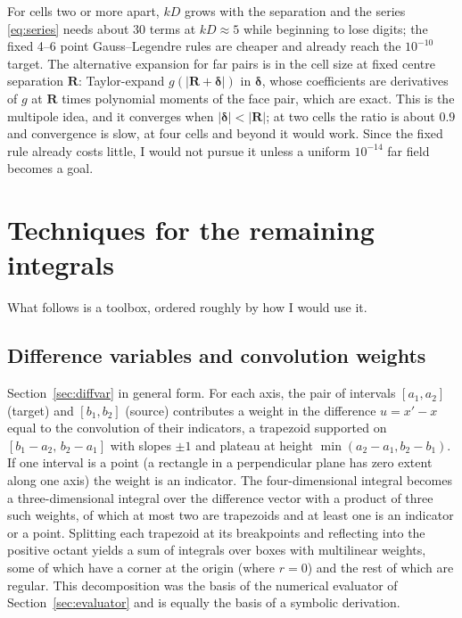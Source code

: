 \documentclass[11pt]{article}
\theoremstyle{remark}
\begin{document}
For cells two or more apart, $kD$ grows with the separation and the series
\eqref{eq:series} needs about 30 terms at $kD\approx 5$ while beginning to lose
digits; the fixed 4--6 point Gauss--Legendre rules are cheaper and already reach the
$10^{-10}$ target. The alternative expansion for far pairs is in the cell size at
fixed centre separation $\mathbf{R}$: Taylor-expand $g(|\mathbf{R} + \boldsymbol{\delta}|)$
in $\boldsymbol{\delta}$, whose coefficients are derivatives of $g$ at $\mathbf{R}$
times polynomial moments of the face pair, which are exact. This is the multipole
idea, and it converges when $|\boldsymbol{\delta}| < |\mathbf{R}|$; at two cells the
ratio is about $0.9$ and convergence is slow, at four cells and beyond it would work.
Since the fixed rule already costs little, I would not pursue it unless a uniform
$10^{-14}$ far field becomes a goal.

\section{Techniques for the remaining integrals}
\label{sec:techniques}

What follows is a toolbox, ordered roughly by how I would use it.

\subsection{Difference variables and convolution weights}

Section~\ref{sec:diffvar} in general form. For each axis, the pair of intervals
$[a_1, a_2]$ (target) and $[b_1, b_2]$ (source) contributes a weight in the difference
$u = x' - x$ equal to the convolution of their indicators, a trapezoid supported on
$[b_1 - a_2,\, b_2 - a_1]$ with slopes $\pm 1$ and plateau at height
$\min(a_2-a_1, b_2-b_1)$. If one interval is a point (a rectangle in a perpendicular
plane has zero extent along one axis) the weight is an indicator. The four-dimensional
integral becomes a three-dimensional integral over the difference vector with a
product of three such weights, of which at most two are trapezoids and at least one is
an indicator or a point. Splitting each trapezoid at its breakpoints and reflecting
into the positive octant yields a sum of integrals over boxes with multilinear
weights, some of which have a corner at the origin (where $r = 0$) and the rest of
which are regular. This decomposition was the basis of the numerical evaluator of
Section~\ref{sec:evaluator} and is equally the basis of a symbolic derivation.
\end{document}
